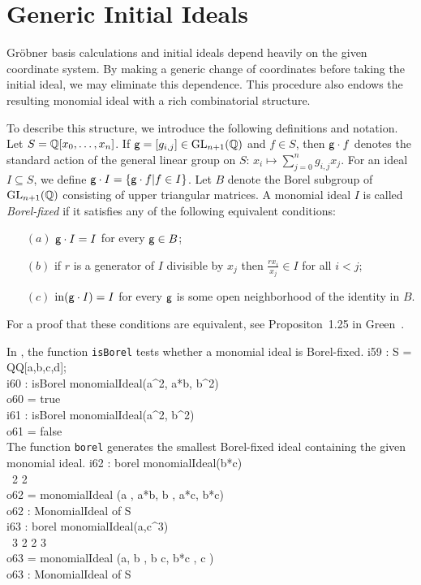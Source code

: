 \section{Generic Initial Ideals}

Gr\"{o}bner basis calculations and initial ideals depend heavily on
the given coordinate system.  By making a generic change of coordinates
before taking the initial ideal, we may eliminate this dependence.
This procedure also endows the resulting monomial ideal with a rich
combinatorial structure.

To describe this structure, we introduce the following definitions and
notation.  Let $S = {\mathbb Q}[x_{0}, \dotsc, x_{n}]$.  If ${\sf g} = [g_{i,j}]
\in \operatorname{GL}_{n+1}({\mathbb Q})$ and $f \in S$, then ${\sf g} \cdot f$ denotes the
standard action of the general linear group on $S$: $x_{i} \mapsto
\sum_{j=0}^{n} g_{i,j} x_{j}$.  For an ideal $I \subseteq S$, we
define ${\sf g} \cdot I = \{ {\sf g} \cdot f | f \in I \}$.  Let $B$ denote
the Borel subgroup of $\operatorname{GL}_{n+1}({\mathbb Q})$ consisting of upper
triangular matrices.  A monomial ideal $I$ is called
{\em Borel-fixed} if it
satisfies any of the following equivalent conditions:
\begin{enumerate}
\item[$(a)$] ${\sf g} \cdot I = I$ for every ${\sf g} \in B$;
\item[$(b)$] if $r$ is a generator of $I$ divisible by $x_{j}$ then
$\frac{rx_{i}}{x_{j}} \in I$ for all $i < j$;
\item[$(c)$] $\operatorname{in}({\sf g} \cdot I) = I$ for every ${\sf g}$ is some open
neighborhood of the identity in $B$.
\end{enumerate}
For a proof that these conditions are equivalent, see Propositon~1.25
in Green~\cite{MR99m:13040}.  

In \Mtwo, the function {\tt isBorel} tests whether a monomial ideal is
Borel-fixed.
\beginOutput
i59 : S = QQ[a,b,c,d];\\
\endOutput
\beginOutput
i60 : isBorel monomialIdeal(a^2, a*b, b^2)\\
\emptyLine
o60 = true\\
\endOutput
\beginOutput
i61 : isBorel monomialIdeal(a^2, b^2)\\
\emptyLine
o61 = false\\
\endOutput
The function {\tt borel} generates the smallest Borel-fixed ideal
containing the given monomial ideal.
\beginOutput
i62 : borel monomialIdeal(b*c)\\
\emptyLine
\                      2        2\\
o62 = monomialIdeal (a , a*b, b , a*c, b*c)\\
\emptyLine
o62 : MonomialIdeal of S\\
\endOutput
\beginOutput
i63 : borel monomialIdeal(a,c^3)\\
\emptyLine
\                         3   2      2   3\\
o63 = monomialIdeal (a, b , b c, b*c , c )\\
\emptyLine
o63 : MonomialIdeal of S\\
\endOutput

